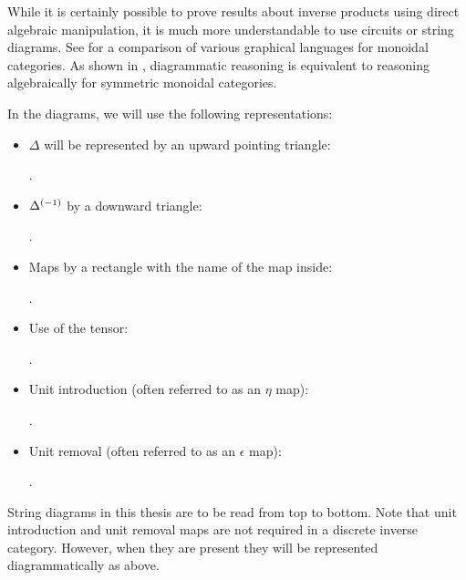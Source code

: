While it is certainly possible to prove results about inverse products using direct algebraic
manipulation, it is much more understandable to use circuits or string diagrams. See
\cite{selinger11:graphical} for a comparison of various graphical languages for monoidal categories.
As shown in
\cite{street-ross-1991-GTC-I}, diagrammatic reasoning is equivalent to reasoning algebraically for
symmetric monoidal categories.

In the diagrams, we will use the following representations:
\begin{itemize}
  \item $\Delta$ will be represented by an upward pointing triangle: .
  \item ${\Delta}^{(-1)}$ by a downward triangle: .
  \item Maps by a rectangle with the name of the map inside: .
  \item Use of the tensor: .
  \item Unit introduction (often referred to as an $\eta$ map): .
  \item Unit removal (often referred to as an $\epsilon$ map): .
\end{itemize}
String diagrams in this thesis are to be read from top to bottom. Note that unit introduction and
unit removal maps are not required in a discrete inverse category. However, when they are present
they will be represented diagrammatically as above.

